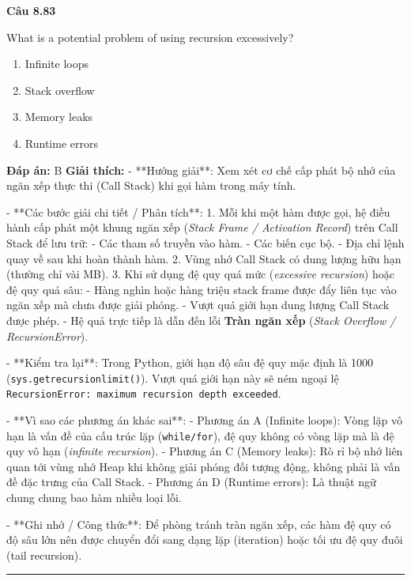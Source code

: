 \documentclass[11pt,a4paper]{article}
\newenvironment{question}[1]{%
  \par\vspace{1em}\noindent\textbf{\large Câu #1}\par\vspace{0.4em}
}{%
  \par\vspace{1em}\hrule\vspace{0.6em}
}
\newenvironment{choices}{%
  \begin{enumerate}[label=\textbf{\Alph*.},leftmargin=2.2em,itemsep=2pt,topsep=3pt]
}{%
  \end{enumerate}
}
\newcommand{\choice}{\item}
\begin{document}
\begin{question}{8.83}
What is a potential problem of using recursion excessively?
\begin{choices}
\choice Infinite loops
\choice Stack overflow
\choice Memory leaks
\choice Runtime errors
\end{choices}
\textbf{Đáp án:} B
\textbf{Giải thích:} - **Hướng giải**:
Xem xét cơ chế cấp phát bộ nhớ của ngăn xếp thực thi (Call Stack) khi gọi hàm trong máy tính.


- **Các bước giải chi tiết / Phân tích**:
1. Mỗi khi một hàm được gọi, hệ điều hành cấp phát một khung ngăn xếp (\textit{Stack Frame / Activation Record}) trên Call Stack để lưu trữ:
   - Các tham số truyền vào hàm.
   - Các biến cục bộ.
   - Địa chỉ lệnh quay về sau khi hoàn thành hàm.
2. Vùng nhớ Call Stack có dung lượng hữu hạn (thường chỉ vài MB).
3. Khi sử dụng đệ quy quá mức (\textit{excessive recursion}) hoặc đệ quy quá sâu:
   - Hàng nghìn hoặc hàng triệu stack frame được đẩy liên tục vào ngăn xếp mà chưa được giải phóng.
   - Vượt quá giới hạn dung lượng Call Stack được phép.
   - Hệ quả trực tiếp là dẫn đến lỗi \textbf{Tràn ngăn xếp} (\textit{Stack Overflow / RecursionError}).


- **Kiểm tra lại**:
Trong Python, giới hạn độ sâu đệ quy mặc định là 1000 (\texttt{sys.getrecursionlimit()}). Vượt quá giới hạn này sẽ ném ngoại lệ \texttt{RecursionError: maximum recursion depth exceeded}.


- **Vì sao các phương án khác sai**:
- Phương án A (Infinite loops): Vòng lặp vô hạn là vấn đề của cấu trúc lặp (\texttt{while/for}), đệ quy không có vòng lặp mà là đệ quy vô hạn (\textit{infinite recursion}).
- Phương án C (Memory leaks): Rò rỉ bộ nhớ liên quan tới vùng nhớ Heap khi không giải phóng đối tượng động, không phải là vấn đề đặc trưng của Call Stack.
- Phương án D (Runtime errors): Là thuật ngữ chung chung bao hàm nhiều loại lỗi.


- **Ghi nhớ / Công thức**:
Để phòng tránh tràn ngăn xếp, các hàm đệ quy có độ sâu lớn nên được chuyển đổi sang dạng lặp (iteration) hoặc tối ưu đệ quy đuôi (tail recursion).
\end{question}
\end{document}
